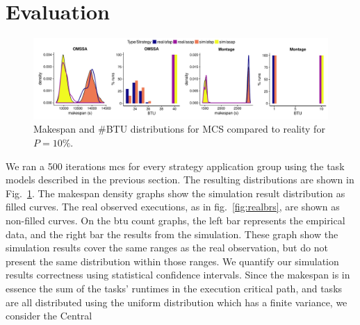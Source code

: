 \documentclass[]{llncs}
\begin{document}
\section{Evaluation}
\label{sec:eval}
\begin{figure}
	\includegraphics[width=\textwidth]{gfx/fit_plot.pdf}
	\caption[caption]{Makespan and \#BTU distributions for MCS compared to
		reality for $P=10\%$.%
	}
	\label{fig:fit}
\end{figure}
We ran a 500 iterations \ac{mcs} for every strategy application group using
the task models described in  the previous section. The  resulting distributions
are  shown  in  Fig.~\ref{fig:fit}.   The makespan  density  graphs  show  the
simulation  result  distribution   as  filled  curves. The  real  observed
executions, as in  fig.~\ref{fig:realbrs}, are shown as  non-filled curves. On 
the \ac{btu} count graphs, the  left bar represents
the empirical data, and the right  bar the results from the simulation.
%
These graph show the simulation results cover the same ranges as the real
observation, but do not present the same distribution within those ranges. 
%
%
We quantify our simulation results correctness using statistical confidence
intervals.   Since the makespan is in essence  the sum of the tasks' runtimes
in the  execution critical path,  and tasks  are all distributed  using the
uniform distribution  which  has a  finite variance,  we consider the Central
\end{document}

